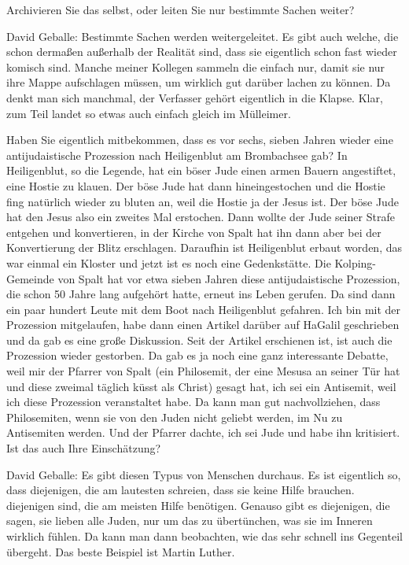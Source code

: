 Archivieren Sie das selbst, oder leiten Sie nur bestimmte Sachen weiter? 

David Geballe: Bestimmte Sachen werden weitergeleitet. Es gibt auch welche, die schon dermaßen außerhalb der Realität sind, dass sie eigentlich schon fast wieder komisch sind. Manche meiner Kollegen sammeln die einfach nur, damit sie nur ihre Mappe aufschlagen müssen, um wirklich gut darüber lachen zu können. Da denkt man sich manchmal, der Verfasser gehört eigentlich in die Klapse. Klar, zum Teil landet so etwas auch einfach gleich im Mülleimer. 

Haben Sie eigentlich mitbekommen, dass es vor sechs, sieben Jahren wieder eine antijudaistische Prozession nach Heiligenblut am Brombachsee gab? 
In Heiligenblut, so die Legende, hat ein böser Jude einen armen Bauern angestiftet, eine Hostie zu klauen. Der böse Jude hat dann hineingestochen und die Hostie fing natürlich wieder zu bluten an, weil die Hostie ja der Jesus ist. Der böse Jude hat den Jesus also ein zweites Mal erstochen. Dann wollte der Jude seiner Strafe entgehen und konvertieren, in der Kirche von Spalt hat ihn dann aber bei der Konvertierung der Blitz erschlagen. Daraufhin ist Heiligenblut erbaut worden, das war einmal ein Kloster und jetzt ist es noch eine Gedenkstätte. Die Kolping-Gemeinde von Spalt hat vor etwa sieben Jahren diese antijudaistische Prozession, die schon 50 Jahre lang aufgehört hatte, erneut ins Leben gerufen. Da sind dann ein paar hundert Leute mit dem Boot nach Heiligenblut gefahren. Ich bin mit der Prozession mitgelaufen, habe dann einen Artikel darüber auf HaGalil geschrieben und da gab es eine große Diskussion. Seit der Artikel erschienen ist, ist auch die Prozession wieder gestorben. Da gab es ja noch eine ganz interessante Debatte, weil mir der Pfarrer von Spalt (ein Philosemit, der eine Mesusa an seiner Tür hat und diese zweimal täglich küsst als Christ) gesagt hat, ich sei ein Antisemit, weil ich diese Prozession veranstaltet habe. Da kann man gut nachvollziehen, dass Philosemiten, wenn sie von den Juden nicht geliebt werden, im Nu zu Antisemiten werden. Und der Pfarrer dachte, ich sei Jude und habe ihn kritisiert. Ist das auch Ihre Einschätzung?  

David Geballe: Es gibt diesen Typus von Menschen durchaus. Es ist eigentlich so, dass diejenigen, die am lautesten schreien, dass sie keine Hilfe brauchen. diejenigen sind, die am meisten Hilfe benötigen. Genauso gibt es diejenigen, die sagen, sie lieben alle Juden, nur um das zu übertünchen, was sie im Inneren wirklich fühlen. Da kann man dann beobachten, wie das sehr schnell ins Gegenteil übergeht. Das beste Beispiel ist Martin Luther. 

